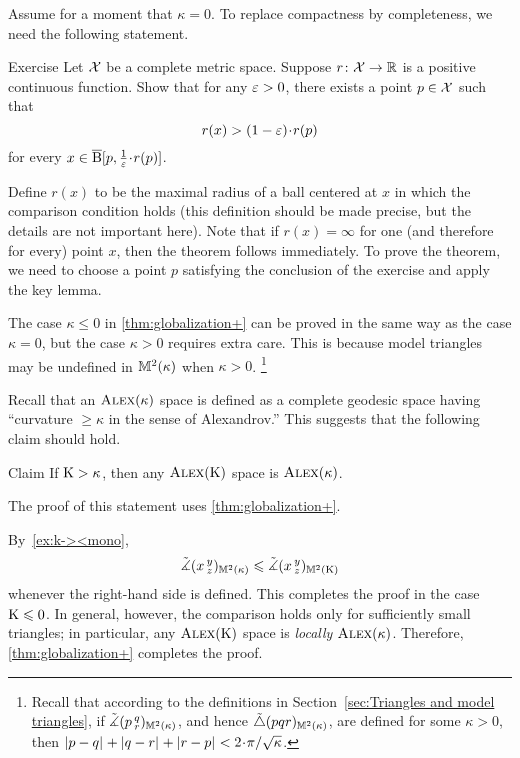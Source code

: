 Assume for a moment that $\kappa=0$.
To replace compactness by completeness, we need the following statement.

\begin{thm}{Exercise}\label{ex:alm-min}
Let $\mathcal{X}$ be a complete metric space.
Suppose $r\colon\mathcal{X}\to \mathbb{R}$ is a positive continuous function.
Show that for any $\varepsilon>0$, there exists a point $p\in \mathcal{X}$ such that
\[
r(x)> (1-\eps)\cdot r(p)
\]
for every $x\in \cBall[p,\tfrac{1}{\eps}\cdot r(p)]$.

\end{thm}

Define $r(x)$ to be the maximal radius of a ball centered at $x$ in which the comparison condition holds (this definition should be made precise, but the details are not important here).
Note that if $r(x)=\infty$ for one (and therefore for every) point $x$, then the theorem follows immediately.
To prove the theorem, we need to choose a point $p$ satisfying the conclusion of the exercise and apply the key lemma.

The case $\kappa\le 0$ in \ref{thm:globalization+} can be proved in the same way as the case $\kappa=0$, but the case $\kappa>0$ requires extra care.
This is because model triangles may be undefined in $\mathbb{M}^2(\kappa)$ when $\kappa>0$.%
\footnote{Recall that according to the definitions in Section~\ref{sec:Triangles and model triangles},
if $\tilde\measuredangle(p\,{}^{q}_{r})_{\mathbb{M}^2(\kappa)}$, and hence $\tilde\triangle(p q r)_{\mathbb{M}^2(\kappa)}$, are defined for some $\kappa>0$, then
$\dist{p}{q}{}+\dist{q}{r}{}+\dist{r}{p}{}< 2\cdot\pi/\sqrt{\kappa}$.}

Recall that an $\textsc{Alex}(\kappa)$ space is defined as a complete geodesic space having ``curvature $\ge\kappa$ in the sense of Alexandrov.''
This suggests that the following claim should hold.

\begin{thm}{Claim}\label{clm:K>k}
If $\mathrm{K}>\kappa$, then any $\textsc{Alex}(\mathrm{K})$ space is $\textsc{Alex}(\kappa)$.
\end{thm}

The proof of this statement uses \ref{thm:globalization+}.

By~\ref{ex:k-><mono},
\[
\tilde\measuredangle(x\,{}^{y}_{z})_{\mathbb{M}^2(\kappa)}\leqslant \tilde\measuredangle(x\,{}^{y}_{z})_{\mathbb{M}^2(\mathrm{K})}
\]
whenever the right-hand side is defined.
This completes the proof in the case $\mathrm{K}\leqslant 0$.
In general, however, the comparison holds only for sufficiently small triangles;
in particular, any $\textsc{Alex}(\mathrm{K})$ space is \emph{locally} $\textsc{Alex}(\kappa)$.
Therefore, \ref{thm:globalization+} completes the proof.
\qeds

